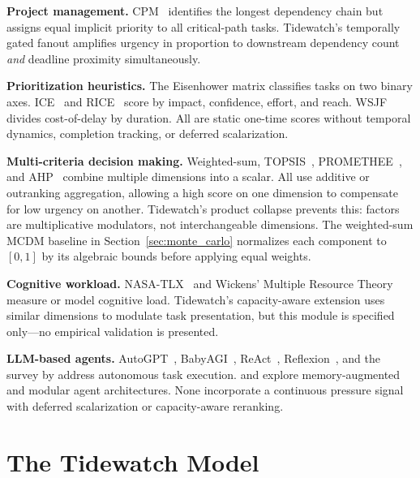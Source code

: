 \documentclass[11pt]{article}
\begin{document}
\textbf{Project management.}
CPM~\citep{kelley1959critical} identifies the longest dependency
chain but assigns equal implicit priority to all critical-path
tasks.  Tidewatch's temporally gated fanout amplifies urgency in
proportion to downstream dependency count \emph{and} deadline
proximity simultaneously.

\textbf{Prioritization heuristics.}
The Eisenhower matrix classifies tasks on two binary axes.
ICE~\citep{ice2016scoring} and RICE~\citep{rice2018intercom} score
by impact, confidence, effort, and reach.
WSJF~\citep{reinertsen2009flow} divides cost-of-delay by duration.
All are static one-time scores without temporal dynamics, completion
tracking, or deferred scalarization.

\textbf{Multi-criteria decision making.}
Weighted-sum, TOPSIS~\citep{hwang1981topsis},
PROMETHEE~\citep{brans1985promethee}, and
AHP~\citep{saaty1980ahp} combine multiple dimensions into a
scalar.  All use additive or outranking aggregation, allowing a high
score on one dimension to compensate for low urgency on another.
Tidewatch's product collapse prevents this: factors are
multiplicative modulators, not interchangeable dimensions.  The
weighted-sum MCDM baseline in Section~\ref{sec:monte_carlo}
normalizes each component to $[0,1]$ by its algebraic bounds before
applying equal weights.

\textbf{Cognitive workload.}
NASA-TLX~\citep{hart1988development} and
Wickens' Multiple Resource Theory~\citep{wickens2008multiple}
measure or model cognitive load.  Tidewatch's capacity-aware
extension uses similar dimensions to modulate task presentation,
but this module is specified only---no empirical validation is
presented.

\textbf{LLM-based agents.}
AutoGPT~\citep{autogpt2023}, BabyAGI~\citep{babyagi2023},
ReAct~\citep{yao2023react}, Reflexion~\citep{shinn2023reflexion},
and the survey by \citet{wang2024survey} address autonomous task
execution.  \citet{park2023generative} and
\citet{khot2023decomposed} explore memory-augmented and modular
agent architectures.  None incorporate a continuous pressure signal
with deferred scalarization or capacity-aware reranking.

\section{The Tidewatch Model}
\label{sec:model}
\end{document}
